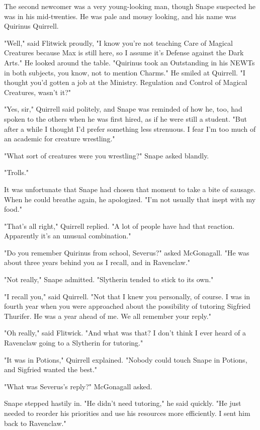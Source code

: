 \documentclass[a4paper,11pt]{article}
\begin{document}
The second newcomer was a very young-looking man, though Snape suspected he was in his mid-twenties. He was pale and mousy looking, and his name was Quirinus Quirrell.

"Well," said Flitwick proudly, "I know you're not teaching Care of Magical Creatures because Max is still here, so I assume it's Defense against the Dark Arts." He looked around the table. "Quirinus took an Outstanding in his NEWTs in both subjects, you know, not to mention Charms." He smiled at Quirrell. "I thought you'd gotten a job at the Ministry. Regulation and Control of Magical Creatures, wasn't it?"

"Yes, sir," Quirrell said politely, and Snape was reminded of how he, too, had spoken to the others when he was first hired, as if he were still a student. "But after a while I thought I'd prefer something less strenuous. I fear I'm too much of an academic for creature wrestling."

"What sort of creatures were you wrestling?" Snape asked blandly.

"Trolls."

It was unfortunate that Snape had chosen that moment to take a bite of sausage. When he could breathe again, he apologized. "I'm not usually that inept with my food."

"That's all right," Quirrell replied. "A lot of people have had that reaction. Apparently it's an unusual combination."

"Do you remember Quirinus from school, Severus?" asked McGonagall. "He was about three years behind you as I recall, and in Ravenclaw."

"Not really," Snape admitted. "Slytherin tended to stick to its own."

"I recall you," said Quirrell. "Not that I knew you personally, of course. I was in fourth year when you were approached about the possibility of tutoring Sigfried Thurifer. He was a year ahead of me. We all remember your reply."

"Oh really," said Flitwick. "And what was that? I don't think I ever heard of a Ravenclaw going to a Slytherin for tutoring."

"It was in Potions," Quirrell explained. "Nobody could touch Snape in Potions, and Sigfried wanted the best."

"What was Severus's reply?" McGonagall asked.

Snape stepped hastily in. "He didn't need tutoring," he said quickly. "He just needed to reorder his priorities and use his resources more efficiently. I sent him back to Ravenclaw."
\end{document}
